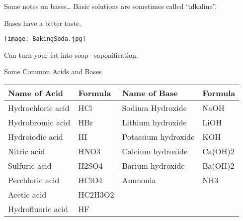 \documentclass[notes=only]{beamer}
\begin{document}
\begin{frame}{Some notes on bases\ldots}
		Basic solutions are sometimes called ``alkaline''.

			\bigskip

			\pause

		Bases have a bitter taste.\hfill
			\parbox{0.5\linewidth}{
				\centering
				\texttt{[image: BakingSoda.jpg]}
				}

			\bigskip

			\pause

		Can turn your fat into soap \textrightarrow\
			\alert{saponification}.
\end{frame}

\begin{frame}{Some Common Acids and Bases}
	\begin{center}
		\small
	\begin{tabular} {l E@{\qquad}l E}
		\toprule
		\bfseries Name of Acid & \bfseries Formula & \bfseries Name of
		Base & \bfseries Formula \\ \midrule
		Hydrochloric acid & HCl & Sodium Hydroxide & NaOH \\
		Hydrobromic acid & HBr & Lithium hydroxide & LiOH \\
		Hydroiodic acid & HI & Potassium hydroxide & KOH \\
		Nitric acid & HNO3 & Calcium hydroxide & Ca(OH)2 \\
		Sulfuric acid & H2SO4 & Barium hydroxide & Ba(OH)2 \\
		Perchloric acid & HClO4 & Ammonia & NH3 \\
		Acetic acid & HC2H3O2 \\
		Hydrofluoric acid & HF \\ \bottomrule
	\end{tabular}
\end{center}
\end{frame}
\end{document}
